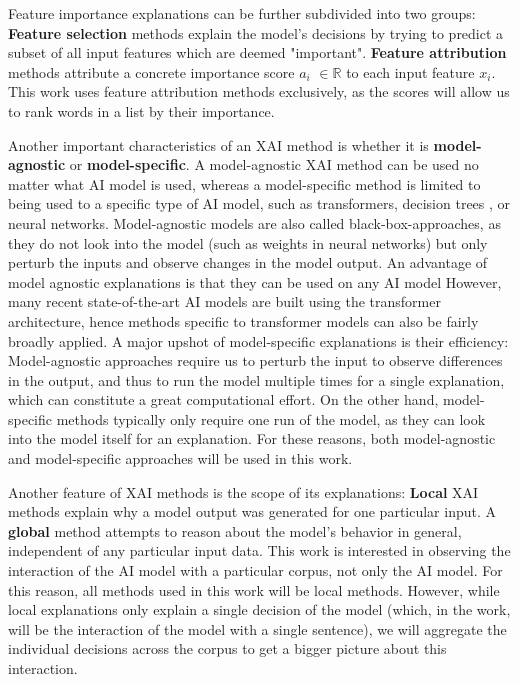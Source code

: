 Feature importance explanations can be further subdivided into two groups:
\textbf{Feature selection} methods explain the model's decisions by trying to predict a subset of all input features which are deemed "important".
\textbf{Feature attribution} methods attribute a concrete importance score $a_i$ $\in \mathbb{R}$ to each input feature $x_i$.
This work uses feature attribution methods exclusively, as the scores will allow us to rank words in a list by their importance.

Another important characteristics of an XAI method is whether it is \textbf{model-agnostic} or \textbf{model-specific}.
A model-agnostic XAI method can be used no matter what AI model is used, whereas a model-specific method is limited to being used to a specific type of AI model, such as transformers, decision trees , or neural networks.
Model-agnostic models are also called black-box-approaches, as they do not look into the model (such as weights in neural networks) but only perturb the inputs and observe changes in the model output.
An advantage of model agnostic explanations is that they can be used on any AI model
However, many recent state-of-the-art AI models are built using the transformer architecture, hence methods specific to transformer models can also be fairly broadly applied.
A major upshot of model-specific explanations is their efficiency:
Model-agnostic approaches require us to perturb the input to observe differences in the output, and thus to run the model multiple times for a single explanation, which can constitute a great computational effort.
On the other hand, model-specific methods typically only require one run of the model, as they can look into the model itself for an explanation.
For these reasons, both model-agnostic and model-specific approaches will be used in this work.

Another feature of XAI methods is the scope of its explanations:
\textbf{Local} XAI methods explain why a model output was generated for one particular input.
A \textbf{global} method attempts to reason about the model's behavior in general, independent of any particular input data.
This work is interested in observing the interaction of the AI model with a particular corpus, not only the AI model.
For this reason, all methods used in this work will be local methods.
However, while local explanations only explain a single decision of the model (which, in the work, will be the interaction of the model with a single sentence), we will aggregate the individual decisions across the corpus to get a bigger picture about this interaction.


